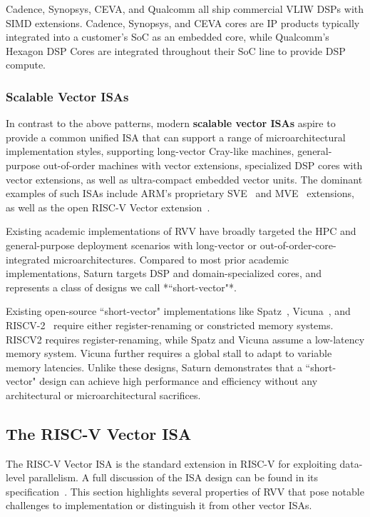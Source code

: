 Cadence, Synopsys, CEVA, and Qualcomm all ship commercial VLIW DSPs with SIMD extensions.
Cadence, Synopsys, and CEVA cores are IP products typically integrated into a customer's SoC as an embedded core, while Qualcomm's Hexagon DSP Cores are integrated throughout their SoC line to provide DSP compute.

\subsubsection{Scalable Vector ISAs}

In contrast to the above patterns, modern \textbf{scalable vector ISAs} aspire to provide a common unified ISA that can support a range of microarchitectural implementation styles, supporting long-vector Cray-like machines, general-purpose out-of-order machines with vector extensions, specialized DSP cores with vector extensions, as well as ultra-compact embedded vector units.
The dominant examples of such ISAs include ARM's proprietary SVE~\cite{arm_sve} and MVE~\cite{arm_mve} extensions, as well as the open RISC-V Vector extension~\cite{vector_extension}.

Existing academic implementations of RVV have broadly targeted the HPC and general-purpose deployment scenarios with long-vector or out-of-order-core-integrated microarchitectures.
Compared to most prior academic implementations, Saturn targets DSP and domain-specialized cores, and represents a class of designs we call *``short-vector"*.

Existing open-source ``short-vector" implementations like Spatz~\cite{spatz}, Vicuna~\cite{vicuna}, and RISCV-2~\cite{patsidis_risc-v2_2020} require either register-renaming or constricted memory systems.
RISCV2 requires register-renaming, while Spatz and Vicuna assume a low-latency memory system.
Vicuna further requires a global stall to adapt to variable memory latencies.
Unlike these designs, Saturn demonstrates that a ``short-vector" design can achieve high performance and efficiency without any architectural or microarchitectural sacrifices.

\subsection{The RISC-V Vector ISA}

The RISC-V Vector ISA is the standard extension in RISC-V for exploiting data-level parallelism.
A full discussion of the ISA design can be found in its specification~\cite{vector_extension}.
This section highlights several properties of RVV that pose notable challenges to implementation or distinguish it from other vector ISAs.


